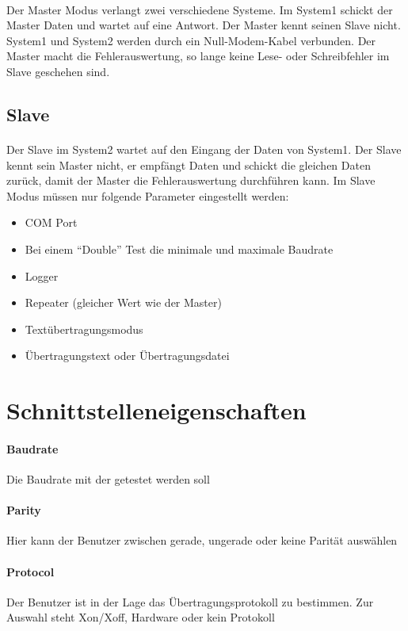 \paragraph{}
Der Master Modus verlangt zwei verschiedene Systeme. Im System1 schickt der Master Daten und wartet auf eine Antwort. Der Master kennt seinen Slave nicht. System1 und System2 werden durch ein Null-Modem-Kabel verbunden. Der Master macht die Fehlerauswertung, so lange keine Lese- oder Schreibfehler im Slave geschehen sind.


\subsection{Slave}
\paragraph{}
Der Slave im System2 wartet auf den Eingang der Daten von System1. Der Slave kennt sein Master nicht, er empfängt Daten und schickt die gleichen Daten zurück, damit der Master die Fehlerauswertung durchführen kann. Im Slave Modus müssen nur folgende Parameter eingestellt werden:

\begin{itemize}
\item COM Port
\item Bei einem "`Double"' Test die minimale und maximale Baudrate
\item Logger
\item Repeater (gleicher Wert wie der Master)
\item Textübertragungsmodus
\item Übertragungstext oder Übertragungsdatei
\end{itemize}


\section{Schnittstelleneigenschaften}

\paragraph{Baudrate} Die Baudrate mit der getestet werden soll
\paragraph{Parity} Hier kann der Benutzer zwischen gerade, ungerade oder keine Parität auswählen
\paragraph{Protocol} Der Benutzer ist in der Lage das Übertragungsprotokoll zu bestimmen. Zur Auswahl steht Xon/Xoff, Hardware oder kein Protokoll
